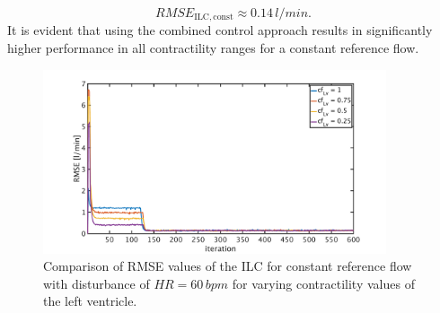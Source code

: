 \begin{equation}
  RMSE_{\mathrm{ILC,const}}\approx0.14\,l/min.
\end{equation}
It is evident that using the combined control approach results in significantly higher performance in all contractility ranges for a constant reference flow.
\begin{figure}[ht!]
  \centering
  \includegraphics[width=0.9\textwidth]{images/chapt_5/ILC/RMSE_dist_const_5_var_cf.pdf}
  \caption[RMSE Comparison of ILC at constant reference flow for varying left ventricular contractilities]{Comparison of RMSE values of the ILC for constant reference flow with disturbance of $HR=60\,bpm$ for varying contractility values of the left ventricle.}
  \label{fig:RMSE_dist_const_5_var_cf}
\end{figure}

